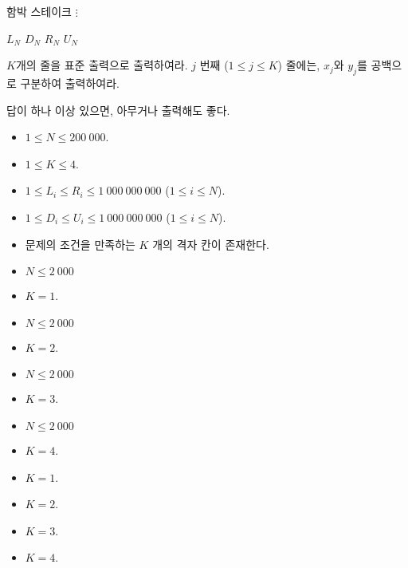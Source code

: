 \begin{problem}{함박 스테이크}
$\vdots$

$L_N$ $D_N$ $R_N$ $U_N$

\OutputFile

$K$개의 줄을 표준 출력으로 출력하여라. $j$ 번째 ($1 \le j \le K$) 줄에는, $x_j$와 $y_j$를 공백으로 구분하여 출력하여라.

답이 하나 이상 있으면, 아무거나 출력해도 좋다.

\Constraints

\begin{itemize}
	\item $1 \le N \le 200\ 000$.
	\item $1 \le K \le 4$.
	\item $1 \le L_i \le R_i \le 1\ 000\ 000\ 000$ ($1 \le i \le N$).
	\item $1 \le D_i \le U_i \le 1\ 000\ 000\ 000$ ($1 \le i \le N$).
	\item 문제의 조건을 만족하는 $K$ 개의 격자 칸이 존재한다.
\end{itemize}


\begin{itemize}
	\item $N \le 2\ 000$
	\item $K=1$.
\end{itemize}
\begin{itemize}
	\item $N \le 2\ 000$
	\item $K=2$.
\end{itemize}
\begin{itemize}
	\item $N \le 2\ 000$
	\item $K=3$.
\end{itemize}
\begin{itemize}
	\item $N \le 2\ 000$
	\item $K=4$.
\end{itemize}
\begin{itemize}
	\item $K=1$.
\end{itemize}
\begin{itemize}
	\item $K=2$.
\end{itemize}
\begin{itemize}
	\item $K=3$.
\end{itemize}
\begin{itemize}
	\item $K=4$.
\end{itemize}


\end{problem}
